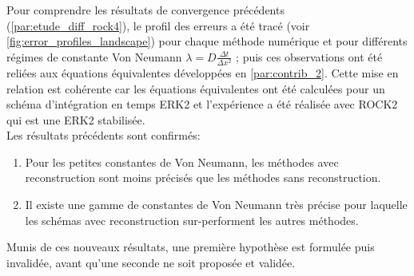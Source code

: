 \label{par:lien_rock_equiv}
Pour comprendre les résultats de convergence précédents (\ref{par:etude_diff_rock4}), le profil des erreurs a été tracé (voir \ref{fig:error_profiles_landscape}) pour chaque méthode numérique et pour différents régimes de constante Von Neumann $\lambda = D \frac{\Delta t}{\Delta x^2}$ ; puis 
ces observations ont été reliées aux équations équivalentes développées en \ref{par:contrib_2}. 
Cette mise en relation est cohérente car les équations équivalentes ont été calculées pour un schéma d'intégration en temps ERK2 et l'expérience a été réalisée avec 
ROCK2 qui est une ERK2 stabilisée.\\
Les résultats précédents sont confirmés:
\begin{enumerate}
    \item Pour les petites constantes de Von Neumann, les méthodes avec reconstruction sont moins précisés que les méthodes sans reconstruction.
    \item Il existe une gamme de constantes de Von Neumann très précise pour laquelle les schémas avec reconstruction sur-performent les autres méthodes.
\end{enumerate}
Munis de ces nouveaux résultats, une première hypothèse est formulée puis invalidée, avant qu'une seconde ne soit proposée et validée.

